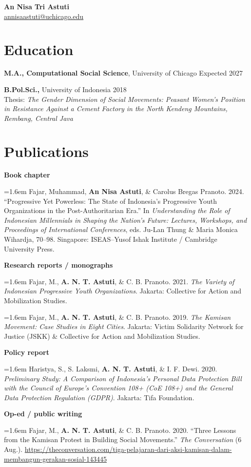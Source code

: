 \documentclass[11pt]{article}
\newcommand{\pub}[1]{\par\hangindent=1.6em\hangafter=1 #1\par}
\begin{document}
{\LARGE \textbf{An Nisa Tri Astuti}}\\
\href{mailto:annisaastuti@uchicago.edu}{annisaastuti@uchicago.edu}

\section*{Education}
\textbf{M.A., Computational Social Science}, University of Chicago \hfill Expected 2027

\textbf{B.Pol.Sci.,} University of Indonesia \hfill 2018\\
Thesis: \emph{The Gender Dimension of Social Movements: Peasant Women’s Position in Resistance Against a Cement Factory in the North Kendeng Mountains, Rembang, Central Java}

\section*{Publications}

\textbf{Book chapter}
\pub{Fajar, Muhammad, \textbf{An Nisa Astuti}, \& Carolus Bregas Pranoto. 2024. ``Progressive Yet Powerless: The State of Indonesia’s Progressive Youth Organizations in the Post-Authoritarian Era.'' In \emph{Understanding the Role of Indonesian Millennials in Shaping the Nation’s Future: Lectures, Workshops, and Proceedings of International Conferences}, eds. Ju-Lan Thung \& Maria Monica Wihardja, 70--98. Singapore: ISEAS--Yusof Ishak Institute / Cambridge University Press.}

\textbf{Research reports / monographs}
\pub{Fajar, M., \textbf{A. N. T. Astuti}, \& C. B. Pranoto. 2021. \emph{The Variety of Indonesian Progressive Youth Organizations}. Jakarta: Collective for Action and Mobilization Studies.}
\pub{Fajar, M., \textbf{A. N. T. Astuti}, \& C. B. Pranoto. 2019. \emph{The Kamisan Movement: Case Studies in Eight Cities}. Jakarta: Victim Solidarity Network for Justice (JSKK) \& Collective for Action and Mobilization Studies.}

\textbf{Policy report}
\pub{Haristya, S., S. Laksmi, \textbf{A. N. T. Astuti}, \& I. F. Dewi. 2020. \emph{Preliminary Study: A Comparison of Indonesia’s Personal Data Protection Bill with the Council of Europe’s Convention 108+ (CoE 108+) and the General Data Protection Regulation (GDPR)}. Jakarta: Tifa Foundation.}

\textbf{Op-ed / public writing}
\pub{Fajar, M., \textbf{A. N. T. Astuti}, \& C. B. Pranoto. 2020. ``Three Lessons from the Kamisan Protest in Building Social Movements.'' \emph{The Conversation} (6 Aug.). \url{https://theconversation.com/tiga-pelajaran-dari-aksi-kamisan-dalam-membangun-gerakan-sosial-143445}}
\end{document}
